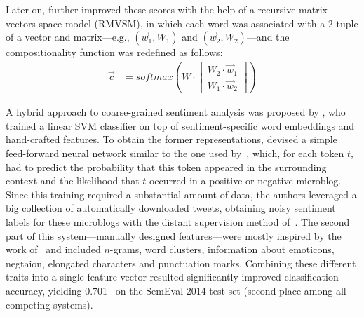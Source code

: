Later on, \citet{Socher:12} further improved these scores with the
help of a recursive matrix-vectors space model (RMVSM), in which each
word was associated with a 2-tuple of a vector and matrix---e.g.,
$(\vec{w}_1, W_1)$ and $(\vec{w}_2, W_2)$---and the compositionality
function was redefined as follows:
\begin{align*}
  \vec{c} &= softmax\left(W\cdot\begin{bmatrix}
  W_2\cdot\vec{w}_1\\
  W_1\cdot\vec{w}_2
  \end{bmatrix}\right)
\end{align*}



A hybrid approach to coarse-grained sentiment analysis was proposed by
\citet{Tang:14b}, who trained a linear SVM classifier on top of
sentiment-specific word embeddings and hand-crafted features.  To
obtain the former representations, \citeauthor{Tang:14b} devised a
simple feed-forward neural network similar to the one used
by~\citet{Collobert:11}, which, for each token $t$, had to predict the
probability that this token appeared in the surrounding context and
the likelihood that $t$ occurred in a positive or negative microblog.
Since this training required a substantial amount of data, the authors
leveraged a big collection of automatically downloaded tweets,
obtaining noisy sentiment labels for these microblogs with the distant
supervision method of~\citet{Go:09}.  The second part of this
system---manually designed features---were mostly inspired by the work
of~\citet{Mohammad:13} and included $n$-grams, word clusters,
information about emoticons, negtaion, elongated characters and
punctuation marks.  Combining these different traits into a single
feature vector resulted significantly improved classification
accuracy, yielding 0.701~\F{} on the SemEval-2014 test set (second
place among all competing systems).


